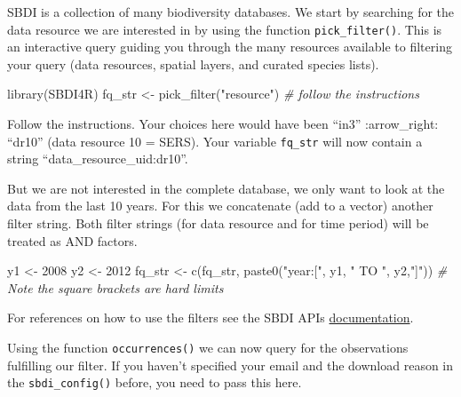 \documentclass[
  10pt,
]{article}
\newenvironment{Shaded}{\begin{snugshade}}{\end{snugshade}}
\newcommand{\CommentTok}[1]{\textcolor[rgb]{0.56,0.35,0.01}{\textit{#1}}}
\newcommand{\DecValTok}[1]{\textcolor[rgb]{0.00,0.00,0.81}{#1}}
\newcommand{\FunctionTok}[1]{\textcolor[rgb]{0.00,0.00,0.00}{#1}}
\newcommand{\NormalTok}[1]{#1}
\newcommand{\OtherTok}[1]{\textcolor[rgb]{0.56,0.35,0.01}{#1}}
\newcommand{\StringTok}[1]{\textcolor[rgb]{0.31,0.60,0.02}{#1}}
\begin{document}
SBDI is a collection of many biodiversity databases. We start by searching for the data resource we are interested in by using the function \texttt{pick\_filter()}. This is an interactive query guiding you through the many resources available to filtering your query (data resources, spatial layers, and curated species lists).

\begin{Shaded}
\begin{Highlighting}[]
\FunctionTok{library}\NormalTok{(SBDI4R)}
\NormalTok{fq\_str }\OtherTok{\textless{}{-}} \FunctionTok{pick\_filter}\NormalTok{(}\StringTok{"resource"}\NormalTok{) }
\CommentTok{\# follow the instructions }
\end{Highlighting}
\end{Shaded}

Follow the instructions. Your choices here would have been ``in3'' :arrow\_right: ``dr10'' (data resource 10 = SERS). Your variable \texttt{fq\_str} will now contain a string ``data\_resource\_uid:dr10''.

But we are not interested in the complete database, we only want to look at the data from the last 10 years. For this we concatenate (add to a vector) another filter string. Both filter strings (for data resource and for time period) will be treated as AND factors.

\begin{Shaded}
\begin{Highlighting}[]
\NormalTok{y1 }\OtherTok{\textless{}{-}} \DecValTok{2008}
\NormalTok{y2 }\OtherTok{\textless{}{-}} \DecValTok{2012}
\NormalTok{fq\_str }\OtherTok{\textless{}{-}} \FunctionTok{c}\NormalTok{(fq\_str, }\FunctionTok{paste0}\NormalTok{(}\StringTok{"year:["}\NormalTok{, y1, }\StringTok{" TO "}\NormalTok{, y2,}\StringTok{"]"}\NormalTok{))}
\CommentTok{\# Note the square brackets are hard limits}
\end{Highlighting}
\end{Shaded}

For references on how to use the filters see the SBDI APIs \href{https://api.biodiversitydata.se/?lang=en-US\#ws3}{documentation}.

Using the function \texttt{occurrences()} we can now query for the observations fulfilling our filter. If you haven't specified your email and the download reason in the \texttt{sbdi\_config()} before, you need to pass this here.
\end{document}

